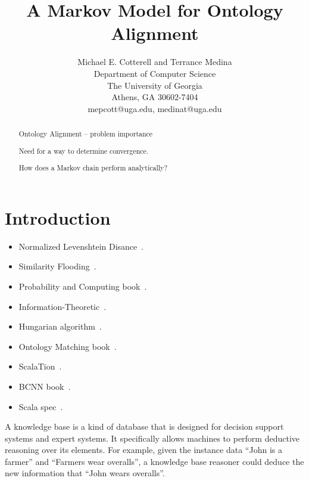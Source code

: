 \documentclass[letterpaper,twocolumn,12pt]{article}
\begin{document}
\newtheorem{defn}{Definition}

\title{A Markov Model for Ontology Alignment}

\author{Michael E. Cotterell and Terrance Medina \\
Department of Computer Science \\
The University of Georgia \\
Athens, GA 30602-7404 \\
mepcott@uga.edu, medinat@uga.edu
}

\maketitle

\begin{abstract}
Ontology Alignment -- problem importance

Need for a way to determine convergence.

How does a Markov chain perform analytically?

\end{abstract}


\section{Introduction}

\begin{itemize}
\item Normalized Levenshtein Disance~\cite{yujian:2007:levenshtein}. 
\item Similarity Flooding~\cite{melnik:2002:similarity}.
\item Probability and Computing book~\cite{mitzenmacher:2005:probability}.
\item Information-Theoretic~\cite{lin:1998:information}.
\item Hungarian algorithm~\cite{kuhn:1955:hungarian}.
\item Ontology Matching book~\cite{euzenat:2007:ontology}.
\item ScalaTion~\cite{miller:2010:scalation}.
\item BCNN book~\cite{bcnn:2010:simulation}.
\item Scala spec~\cite{odersky:2011:spec}.
\end{itemize}

A knowledge base is a kind of database that is designed 
for decision support systems and expert systems. It specifically allows
machines to perform deductive reasoning over its elements.
For example, given the instance data ``John is a farmer'' and ``Farmers
wear overalls'', a knowledge base reasoner could deduce the new information
that ``John wears overalls''.
\end{document}
